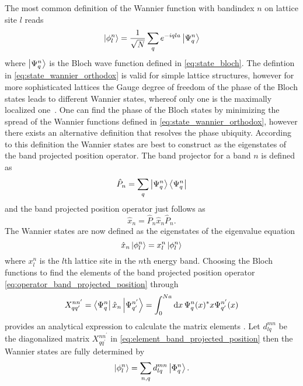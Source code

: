The most common definition of the Wannier function with bandindex $n$ on
lattice site $l$ reads
\begin{equation}
  \ket{\phi^n_{l}}
  =\frac{1}{\sqrt{N}}\sum_qe^{-iqla}\ket{\Psi^n_{q}}
  \label{eq:state_wannier_orthodox}
\end{equation}
where $\ket{\Psi^n_q}$ is the Bloch wave function defined in
\cref{eq:state_bloch}. The defintion in \cref{eq:state_wannier_orthodox} is
valid for simple lattice structures, however for more sophisticated lattices
the Gauge degree of freedom of the phase of the Bloch states leads to
different Wannier states, whereof only one is the maximally localized
one~\cite{Goerg2014}. One can find the phase of the Bloch states by minimizing
the spread of the Wannier functions defined in
\cref{eq:state_wannier_orthodox}, however there exists an alternative
definition that resolves the phase ubiquity. According to this definition the
Wannier states are best to construct as the eigenstates of the band projected
position operator. The band projector for a band $n$ is defined as
\begin{equation}
  \hat{P}_n
  =\sum_q\ket{\Psi^n_q}\bra{\Psi^n_q}
  \label{eq:operator_band_projector}
\end{equation}
and the band projected position operator just follows as
\begin{equation}
  \hat{x}_n
  =\hat{P}_n\hat{x}_n\hat{P}_n
  \label{eq:operator_band_projected_position}.
\end{equation}
The Wannier states are now defined as the eigenstates of the eigenvalue
equation
\begin{equation}
  \hat{x}_n\ket{\phi^n_l}=x^n_l\ket{\phi^n_l}
  \label{eq:eigenvalue_band_projected_position}
\end{equation}
where $x^n_l$ is the $l$th lattice site in the $n$th energy band. Choosing
the Bloch functions to find the elements of the band projected position
operator \cref{eq:operator_band_projected_position} through
\begin{equation}
  X^{nn^\prime}_{qq^\prime}
  =\bra{\Psi^n_q}\hat{x}_n\ket{\Psi^{n^\prime}_{q^\prime}}
  =\int_0^{Na}\dd{x}\Psi^n_q(x)^*x\Psi^{n^\prime}_{q^\prime}(x)
  \label{eq:element_band_projected_position}
\end{equation}
provides an analytical expression to calculate the matrix elements
\cite{Bissbort2013}. Let $d^{mn}_{lq}$ be the diagonalized
matrix $X^{nn^\prime}_{qq^\prime}$ in
\cref{eq:element_band_projected_position} then the Wannier states are fully
determined by
\begin{equation}
  \ket{\phi^n_l}
  =\sum_{n,q}d^{mn}_{lq}\ket{\Phi^n_q}
  \label{eq:state_wannier}.
\end{equation}

